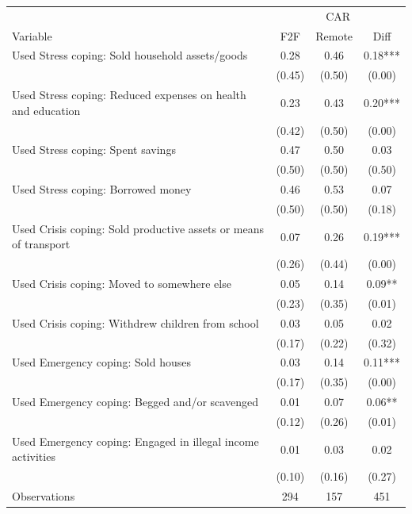 \begin{tabular}{l*{3}c}
\hline\hline
 & \multicolumn{3}{c}{CAR}\\ 
Variable & F2F & Remote & Diff \\
\hline
Used Stress coping: Sold household assets/goods&0.28&0.46&0.18***\\
&(0.45)&(0.50)&(0.00)\\
Used Stress coping: Reduced expenses on health and education&0.23&0.43&0.20***\\
&(0.42)&(0.50)&(0.00)\\
Used Stress coping: Spent savings&0.47&0.50&0.03\\
&(0.50)&(0.50)&(0.50)\\
Used Stress coping: Borrowed money&0.46&0.53&0.07\\
&(0.50)&(0.50)&(0.18)\\
Used Crisis coping: Sold productive assets or means of transport&0.07&0.26&0.19***\\
&(0.26)&(0.44)&(0.00)\\
Used Crisis coping: Moved to somewhere else&0.05&0.14&0.09**\\
&(0.23)&(0.35)&(0.01)\\
Used Crisis coping: Withdrew children from school&0.03&0.05&0.02\\
&(0.17)&(0.22)&(0.32)\\
Used Emergency coping: Sold houses&0.03&0.14&0.11***\\
&(0.17)&(0.35)&(0.00)\\
Used Emergency coping: Begged and/or scavenged&0.01&0.07&0.06**\\
&(0.12)&(0.26)&(0.01)\\
Used Emergency coping: Engaged in illegal income activities&0.01&0.03&0.02\\
&(0.10)&(0.16)&(0.27)\\
\hline
Observations & 294 & 157 & 451 \\
\hline\hline
\end{tabular}

